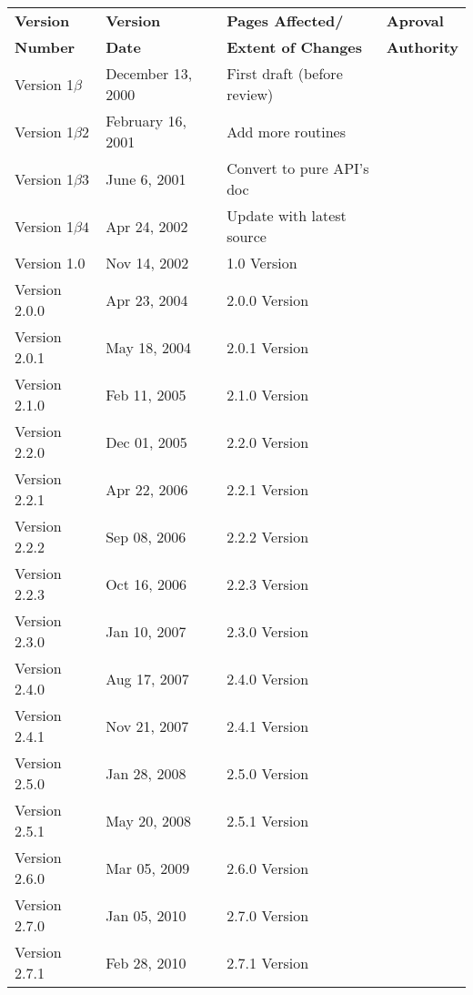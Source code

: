 \documentclass{article}
\begin{document}
\begin{center}
\begin{tabular}{|l|l|l|l|}\hline
{\bf Version} & {\bf Version} & {\bf Pages Affected/}   & {\bf Aproval}\\
{\bf Number}  & {\bf Date}    & {\bf Extent of Changes} & {\bf Authority}\\
\hline
\hline 
Version 1$\beta$ & December 13, 2000      & First draft (before review) &
\\\hline
Version 1$\beta2$ & February 16, 2001      & Add more routines &
\\\hline
Version 1$\beta3$ & June 6, 2001      & Convert to pure API's doc &
\\\hline
Version 1$\beta4$ & Apr 24, 2002      & Update with latest source &
\\\hline
Version 1.0 & Nov 14, 2002      & 1.0 Version &
\\\hline
Version 2.0.0 & Apr 23, 2004      & 2.0.0 Version &
\\\hline
Version 2.0.1 & May 18, 2004      & 2.0.1 Version &
\\\hline
Version 2.1.0 & Feb 11, 2005      & 2.1.0 Version &
\\\hline
Version 2.2.0 & Dec 01, 2005      & 2.2.0 Version &
\\\hline
Version 2.2.1 & Apr 22, 2006      & 2.2.1 Version &
\\\hline
Version 2.2.2 & Sep 08, 2006      & 2.2.2 Version &
\\\hline
Version 2.2.3 & Oct 16, 2006      & 2.2.3 Version &
\\\hline
Version 2.3.0 & Jan 10, 2007      & 2.3.0 Version &
\\\hline
Version 2.4.0 & Aug 17, 2007      & 2.4.0 Version &
\\\hline
Version 2.4.1 & Nov 21, 2007      & 2.4.1 Version &
\\\hline
Version 2.5.0 & Jan 28, 2008      & 2.5.0 Version &
\\\hline
Version 2.5.1 & May 20, 2008      & 2.5.1 Version &
\\\hline
Version 2.6.0 & Mar 05, 2009      & 2.6.0 Version &
\\\hline
Version 2.7.0 & Jan 05, 2010      & 2.7.0 Version &
\\\hline
Version 2.7.1 & Feb 28, 2010      & 2.7.1 Version &
\\\hline
\end{tabular}
\end{center}
\end{document}
